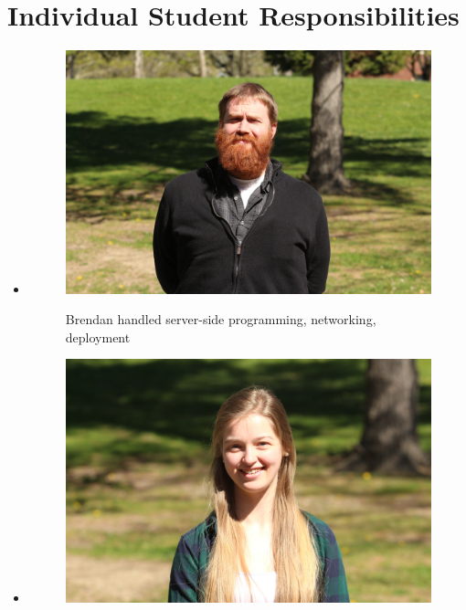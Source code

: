 \documentclass{article}
\begin{document}
	\section{Individual Student Responsibilities}\label{sec:responsibilities}
		\begin{minipage}{0.45\textwidth}
			\begin{itemize}[label={}]
  				\item
  					\begin{figure}[H]
  						\includegraphics[scale=.07]{brendan.jpg}\\
  							\captionsetup{labelformat=empty}
  							\caption{Brendan handled server-side programming, networking, deployment}
  					\end{figure}
  				\item
  					\begin{figure}[H]
  						\includegraphics[scale=.07]{heidi.jpg}\\

\end{figure}
\end{itemize}
\end{minipage}
\end{document}
